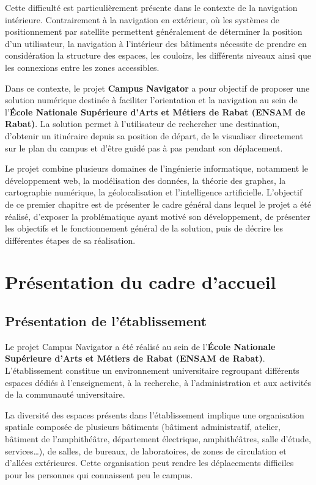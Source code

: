 \documentclass[12pt,a4paper]{report}
\begin{document}
Cette difficulté est particulièrement présente dans le contexte de la navigation intérieure.
Contrairement à la navigation en extérieur, où les systèmes de positionnement par satellite
permettent généralement de déterminer la position d'un utilisateur, la navigation à l'intérieur
des bâtiments nécessite de prendre en considération la structure des espaces, les couloirs, les
différents niveaux ainsi que les connexions entre les zones accessibles.

Dans ce contexte, le projet \textbf{Campus Navigator} a pour objectif de proposer une solution
numérique destinée à faciliter l'orientation et la navigation au sein de l'\textbf{École
Nationale Supérieure d'Arts et Métiers de Rabat (ENSAM de Rabat)}. La solution permet à
l'utilisateur de rechercher une destination, d'obtenir un itinéraire depuis sa position de
départ, de le visualiser directement sur le plan du campus et d'être guidé pas à pas pendant son
déplacement.

Le projet combine plusieurs domaines de l'ingénierie informatique, notamment le développement
web, la modélisation des données, la théorie des graphes, la cartographie numérique, la
géolocalisation et l'intelligence artificielle. L'objectif de ce premier chapitre est de
présenter le cadre général dans lequel le projet a été réalisé, d'exposer la problématique ayant
motivé son développement, de présenter les objectifs et le fonctionnement général de la
solution, puis de décrire les différentes étapes de sa réalisation.

\section{Présentation du cadre d'accueil}

\subsection{Présentation de l'établissement}

Le projet Campus Navigator a été réalisé au sein de l'\textbf{École Nationale Supérieure d'Arts
et Métiers de Rabat (ENSAM de Rabat)}. L'établissement constitue un environnement universitaire
regroupant différents espaces dédiés à l'enseignement, à la recherche, à l'administration et aux
activités de la communauté universitaire.

La diversité des espaces présents dans l'établissement implique une organisation spatiale
composée de plusieurs bâtiments (bâtiment administratif, atelier, bâtiment de l'amphithéâtre,
département électrique, amphithéâtres, salle d'étude, services\ldots), de salles, de bureaux,
de laboratoires, de zones de circulation et d'allées extérieures. Cette organisation peut rendre
les déplacements difficiles pour les personnes qui connaissent peu le campus.
\end{document}
